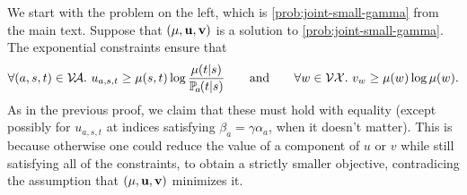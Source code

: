 \begin{subappendices}
\begin{lproof}\label{proof:joint-small-gamma-correct}
    We start with the problem on the left, which is \eqref{prob:joint-small-gamma} from the main text.
    Suppose that $(\mu, \mathbf u, \mathbf v)$ is a solution to \eqref{prob:joint-small-gamma}.
    The exponential constraints ensure that
    \[
        \forall (a,s,t) \in \V\!\Ar.~
        u_{a,s,t} \ge \mu(s,t) \log \frac{\mu(t|s)}{\p_a(t|s)}
    \qquad\text{and}\qquad
        \forall w \in \V \X.~
        v_{w} \ge \mu(w) \log \mu(w).
    \]
    As in the previous proof, we claim that these must hold with equality (except possibly for $u_{a,s,t}$ at indices satisfying $\beta_a = \gamma \alpha_a$, when it doesn't matter).
    This is because otherwise one could reduce the value of a component of $u$ or $v$ while still satisfying all of the constraints, to obtain a strictly smaller objective, contradicing the assumption that $(\mu, \mathbf u, \mathbf v)$ minimizes it.


\end{lproof}
\end{subappendices}
